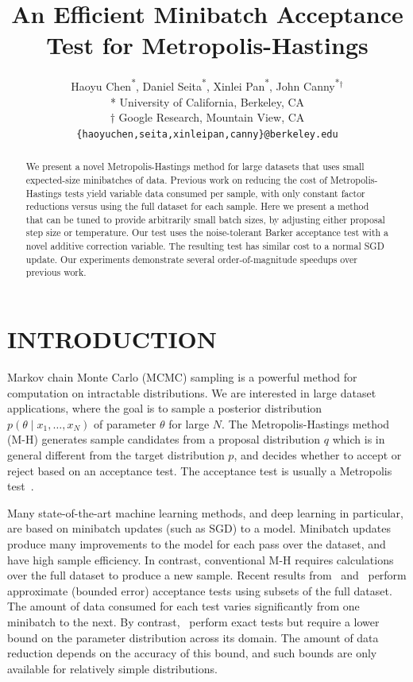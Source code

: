 \documentclass{article}
\title{An Efficient Minibatch Acceptance Test for Metropolis-Hastings}
\author{
  Haoyu Chen\textsuperscript{*}, Daniel Seita\textsuperscript{*},
  Xinlei Pan\textsuperscript{*}, John Canny\textsuperscript{*}$^{\dag}$ \\
  * University of California, Berkeley, CA \\
  $\dag$ Google Research, Mountain View, CA\\
  \texttt{\{haoyuchen,seita,xinleipan,canny\}@berkeley.edu}
 }
\begin{document}
\maketitle


\begin{abstract}
  We present a novel Metropolis-Hastings method for large datasets that
  uses small expected-size minibatches of data. Previous work on
  reducing the cost of Metropolis-Hastings tests yield variable data
  consumed per sample, with only constant factor reductions versus
  using the full dataset for each sample.  Here we present a method
  that can be tuned to provide arbitrarily small batch sizes, by
  adjusting either proposal step size or temperature. Our test uses
  the noise-tolerant Barker acceptance test with a novel additive
  correction variable.  The resulting test has similar cost to a normal
  SGD update. Our experiments demonstrate several order-of-magnitude
  speedups over previous work.
\end{abstract}

\section{INTRODUCTION}\label{sec:introduction}

Markov chain Monte Carlo (MCMC) sampling is a powerful method for computation on
intractable distributions. We are interested in large dataset applications,
where the goal is to sample a posterior distribution $p(\theta \mid x_1, \ldots,
x_N)$ of parameter $\theta$ for large $N$.  The Metropolis-Hastings method (M-H)
generates sample candidates from a proposal distribution $q$ which is in general
different from the target distribution $p$, and decides whether to accept or
reject based on an acceptance test. The acceptance test is usually a Metropolis
test~\cite{Metropolis1953, hastings70}.

Many state-of-the-art machine learning methods, and deep learning in particular,
are based on minibatch updates (such as SGD) to a model.  Minibatch updates
produce many improvements to the model for each pass over the dataset, and have
high sample efficiency.  In contrast, conventional M-H requires calculations
over the full dataset to produce a new sample.  Recent results
from~\cite{cutting_mh_2014} and~\cite{icml2014c1_bardenet14} perform
approximate (bounded error) acceptance tests using subsets of the full dataset.
The amount of data consumed for each test varies significantly from one
minibatch to the next. By contrast,~\cite{conf/uai/MaclaurinA14,TallData15}
perform exact tests but require a lower bound on the parameter distribution across
its domain.  The amount of data reduction depends on the accuracy of this bound,
and such bounds are only available for relatively simple distributions.
\end{document}
